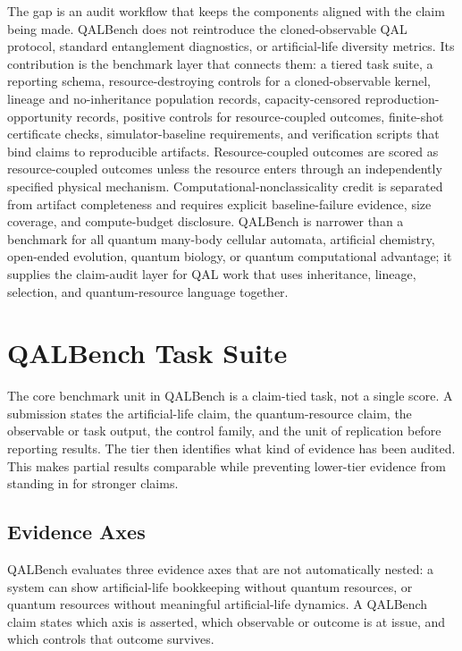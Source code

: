 \documentclass[11pt]{article}
\begin{document}
The gap is an audit workflow that keeps the components aligned with the claim being made. QALBench does not reintroduce the cloned-observable QAL protocol, standard entanglement diagnostics, or artificial-life diversity metrics. Its contribution is the benchmark layer that connects them: a tiered task suite, a reporting schema, resource-destroying controls for a cloned-observable kernel, lineage and no-inheritance population records, capacity-censored reproduction-opportunity records, positive controls for resource-coupled outcomes, finite-shot certificate checks, simulator-baseline requirements, and verification scripts that bind claims to reproducible artifacts. Resource-coupled outcomes are scored as resource-coupled outcomes unless the resource enters through an independently specified physical mechanism. Computational-nonclassicality credit is separated from artifact completeness and requires explicit baseline-failure evidence, size coverage, and compute-budget disclosure. QALBench is narrower than a benchmark for all quantum many-body cellular automata, artificial chemistry, open-ended evolution, quantum biology, or quantum computational advantage; it supplies the claim-audit layer for QAL work that uses inheritance, lineage, selection, and quantum-resource language together.

\section{QALBench Task Suite}

The core benchmark unit in QALBench is a claim-tied task, not a single score. A submission states the artificial-life claim, the quantum-resource claim, the observable or task output, the control family, and the unit of replication before reporting results. The tier then identifies what kind of evidence has been audited. This makes partial results comparable while preventing lower-tier evidence from standing in for stronger claims.

\subsection{Evidence Axes}

QALBench evaluates three evidence axes that are not automatically nested: a system can show artificial-life bookkeeping without quantum resources, or quantum resources without meaningful artificial-life dynamics. A QALBench claim states which axis is asserted, which observable or outcome is at issue, and which controls that outcome survives.
\end{document}
